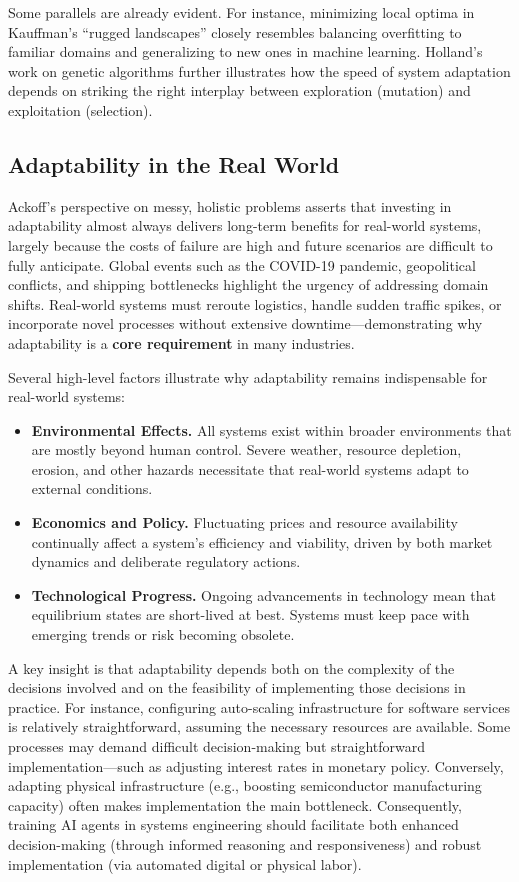 Some parallels are already evident. For instance, minimizing local optima in Kauffman’s “rugged landscapes” \cite{kauffman1993} closely resembles balancing overfitting to familiar domains and generalizing to new ones in machine learning. Holland’s work on genetic algorithms \cite{holland1975, holland1992} further illustrates how the speed of system adaptation depends on striking the right interplay between exploration (mutation) and exploitation (selection).

\subsection{Adaptability in the Real World}
Ackoff’s perspective on messy, holistic problems \cite{ackoff1974} asserts that investing in adaptability almost always delivers long-term benefits for real-world systems, largely because the costs of failure are high and future scenarios are difficult to fully anticipate. Global events such as the COVID-19 pandemic, geopolitical conflicts, and shipping bottlenecks highlight the urgency of addressing domain shifts. Real-world systems must reroute logistics, handle sudden traffic spikes, or incorporate novel processes without extensive downtime—demonstrating why adaptability is a \textbf{core requirement} in many industries.

Several high-level factors illustrate why adaptability remains indispensable for real-world systems:
\begin{itemize}
    \item \textbf{Environmental Effects.} All systems exist within broader environments that are mostly beyond human control. Severe weather, resource depletion, erosion, and other hazards necessitate that real-world systems adapt to external conditions.
    \item \textbf{Economics and Policy.} Fluctuating prices and resource availability continually affect a system’s efficiency and viability, driven by both market dynamics and deliberate regulatory actions.
    \item \textbf{Technological Progress.} Ongoing advancements in technology mean that equilibrium states are short-lived at best. Systems must keep pace with emerging trends or risk becoming obsolete.
\end{itemize}

A key insight is that adaptability depends both on the complexity of the decisions involved and on the feasibility of implementing those decisions in practice. For instance, configuring auto-scaling infrastructure for software services is relatively straightforward, assuming the necessary resources are available. Some processes may demand difficult decision-making but straightforward implementation—such as adjusting interest rates in monetary policy. Conversely, adapting physical infrastructure (e.g., boosting semiconductor manufacturing capacity) often makes implementation the main bottleneck. Consequently, training AI agents in systems engineering should facilitate both enhanced decision-making (through informed reasoning and responsiveness) and robust implementation (via automated digital or physical labor).

